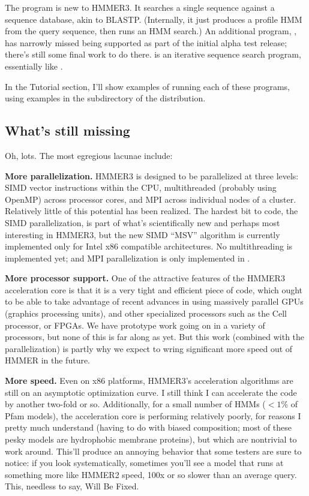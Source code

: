 The  program is new to HMMER3. It searches a single
sequence against a sequence database, akin to BLASTP. (Internally, it
just produces a profile HMM from the query sequence, then runs an HMM
search.) An additional program, , has narrowly missed
being supported as part of the initial alpha test release; there's
still some final work to do there.  is an iterative
sequence search program, essentially like . 

In the Tutorial section, I'll show examples of running each of these
programs, using examples in the  subdirectory of the
distribution.




\subsection{What's still missing}

Oh, lots. The most egregious lacunae include:

\textbf{More parallelization.} HMMER3 is designed to be parallelized
at three levels: SIMD vector instructions within the CPU,
multithreaded (probably using OpenMP) across processor cores, and MPI
across individual nodes of a cluster. Relatively little of this
potential has been realized. The hardest bit to code, the SIMD
parallelization, is part of what's scientifically new and perhaps most
interesting in HMMER3, but the new SIMD ``MSV'' algorithm is currently
implemented only for Intel x86 compatible architectures. No
multithreading is implemented yet; and MPI parallelization is only
implemented in .

\textbf{More processor support.} One of the attractive features of the
HMMER3 acceleration core is that it is a very tight and efficient
piece of code, which ought to be able to take advantage of recent
advances in using massively parallel GPUs (graphics processing units),
and other specialized processors such as the Cell processor, or
FPGAs. We have prototype work going on in a variety of processors, but
none of this is far along as yet. But this work (combined with the
parallelization) is partly why we expect to wring significant more
speed out of HMMER in the future.

\textbf{More speed.} Even on x86 platforms, HMMER3's acceleration
algorithms are still on an asymptotic optimization curve. I still
think I can accelerate the code by another two-fold or
so. Additionally, for a small number of HMMs ($<1$\% of Pfam models),
the acceleration core is performing relatively poorly, for reasons I
pretty much understand (having to do with biased composition; most of
these pesky models are hydrophobic membrane proteins), but which are
nontrivial to work around. This'll produce an annoying behavior that
some testers are sure to notice: if you look systematically, sometimes
you'll see a model that runs at something more like HMMER2 speed, 100x
or so slower than an average query. This, needless to say, Will Be
Fixed.

